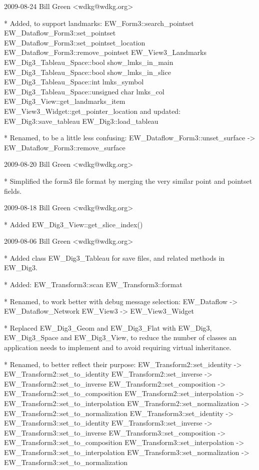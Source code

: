 \begin{DoxyVerbInclude}
2009-08-24  Bill Green  <wdkg@wdkg.org>

    * Added, to support landmarks:
        EW_Form3::search_pointset
        EW_Dataflow_Form3::set_pointset
        EW_Dataflow_Form3::set_pointset_location
        EW_Dataflow_Form3::remove_pointset
        EW_View3_Landmarks
        EW_Dig3_Tableau_Space::bool show_lmks_in_main
        EW_Dig3_Tableau_Space::bool show_lmks_in_slice
        EW_Dig3_Tableau_Space::int lmks_symbol
        EW_Dig3_Tableau_Space::unsigned char lmks_col
        EW_Dig3_View::get_landmarks_item
        EW_View3_Widget::get_pointer_location
    and updated:
        EW_Dig3::save_tableau
        EW_Dig3::load_tableau

    * Renamed, to be a little less confusing:
        EW_Dataflow_Form3::unset_surface -> EW_Dataflow_Form3::remove_surface


2009-08-20  Bill Green  <wdkg@wdkg.org>

    * Simplified the form3 file format by merging the very similar point
    and pointset fields.


2009-08-18  Bill Green  <wdkg@wdkg.org>

    * Added EW_Dig3_View::get_slice_index()


2009-08-06  Bill Green  <wdkg@wdkg.org>

    * Added class EW_Dig3_Tableau for save files, and related methods in
    EW_Dig3.

    * Added:
        EW_Transform3::scan
        EW_Transform3::format

    * Renamed, to work better with debug message selection:
        EW_Dataflow -> EW_Dataflow_Network
        EW_View3 -> EW_View3_Widget

    * Replaced EW_Dig3_Geom and EW_Dig3_Flat with EW_Dig3, EW_Dig3_Space and
    EW_Dig3_View, to reduce the number of classes an application needs to
    implement and to avoid requiring virtual inheritance.

    * Renamed, to better reflect their purpose:
        EW_Transform2::set_identity -> EW_Transform2::set_to_identity
        EW_Transform2::set_inverse -> EW_Transform2::set_to_inverse
        EW_Transform2::set_composition -> EW_Transform2::set_to_composition
        EW_Transform2::set_interpolation -> EW_Transform2::set_to_interpolation
        EW_Transform2::set_normalization -> EW_Transform2::set_to_normalization
        EW_Transform3::set_identity -> EW_Transform3::set_to_identity
        EW_Transform3::set_inverse -> EW_Transform3::set_to_inverse
        EW_Transform3::set_composition -> EW_Transform3::set_to_composition
        EW_Transform3::set_interpolation -> EW_Transform3::set_to_interpolation
        EW_Transform3::set_normalization -> EW_Transform3::set_to_normalization


\end{DoxyVerbInclude}
